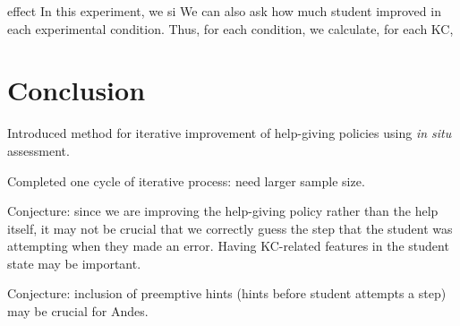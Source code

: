 \documentclass{edm_template}
\begin{document}
effect 
In this experiment, we si
We can also ask how much student improved in each experimental condition.
Thus, for each condition, we calculate, for each KC, 

\section{Conclusion}

Introduced method for iterative improvement of help-giving policies using 
{\em in situ} assessment.

Completed one cycle of iterative process:  need larger sample size.

Conjecture:  since we are improving the help-giving policy rather than the
help itself, it may not be crucial that we correctly guess the step
that the student was attempting when they made an error.  Having
KC-related features in the student state may be important.

Conjecture: inclusion of preemptive hints (hints before student attempts
a step) may be crucial for Andes. 



\end{document}
